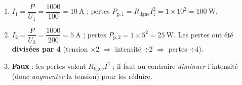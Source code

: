 \documentclass[11pt,a4paper]{article}
\begin{document}
\begin{corrige}
\begin{enumerate}[label=\alph*)]
  \item $I_1=\dfrac{P}{U_1}=\dfrac{1000}{100}=\qty{10}{\ampere}$ ; pertes
        $P_{\text{p},1}=R_{\text{ligne}}I_1^{2}=1\times10^{2}=\qty{100}{\watt}$.
  \item $I_2=\dfrac{P}{U_2}=\dfrac{1000}{200}=\qty{5}{\ampere}$ ; pertes
        $P_{\text{p},2}=1\times5^{2}=\qty{25}{\watt}$. Les pertes ont été \textbf{divisées par 4}
        (tension $\times2$ $\Rightarrow$ intensité $\div2$ $\Rightarrow$ pertes $\div4$).
  \item \textbf{Faux} : les pertes valent $R_{\text{ligne}}I^{2}$ ; il faut au contraire \emph{diminuer}
        l'intensité (donc \emph{augmenter} la tension) pour les réduire.
\end{enumerate}
\end{corrige}
\end{document}
